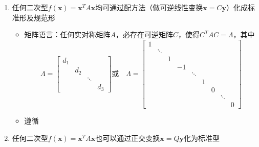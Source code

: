 \documentclass[./linear_algebra.tex]{subfiles}
\begin{document}
    \begin{enumerate}
        \item 任何二次型$f(\boldsymbol{x})=\boldsymbol{x}^{T}A\boldsymbol{x}$均可通过$\boxed{\textbf{配方法}}$（做可逆线性变换$\boldsymbol{x}=C\boldsymbol{y}$）化成标准形及规范形
        \begin{itemize}
            \item 矩阵语言：任何实对称矩阵$A$，必存在可逆矩阵$C$，使得$C^{T}AC = \Lambda$，其中
            \[
                \Lambda = \begin{bmatrix}
                              d_1& & &\\
                              & d_2 & &\\
                              & & \ddots &\\
                              & & & d_3
                \end{bmatrix}\text{或} \quad \Lambda = \begin{bmatrix}
                                                           1 & & & & & & & &\\
                                                           &  \ddots & &&&&&&\\
                                                           &  & 1 &&&&&& \\
                                                           &  &  &-1&&&&& \\
                                                           &  & &&\ddots &&&&\\
                                                           &  & &&&1&&&\\
                                                           &  & &&&&0&&\\
                                                           &  & &&&&&\ddots&\\
                                                           &  & &&&&&&0
                \end{bmatrix}
            \]
            \item 遵循{\color{customgreen}{将某个变量的平方项及与其有关的混合项一次配完，配成一个完全平方，减少一个未配完全平方的变量，使得总的平方项的项数小于等于变量个数}}
        \end{itemize}
        \item 任何二次型$f(\boldsymbol{x})=\boldsymbol{x}^{T}A\boldsymbol{x}$也可以通过$\boxed{\textbf{正交变换}}\boldsymbol{x}=Q\boldsymbol{y}$化为标准型
        \begin{itemize}

\end{itemize}
\end{enumerate}
\end{document}
